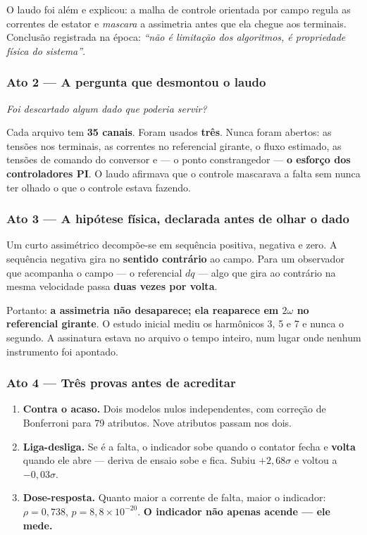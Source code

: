 \documentclass[12pt,a4paper]{article}
\begin{document}
O laudo foi além e explicou: a malha de controle orientada por campo regula as correntes de estator e \emph{mascara} a assimetria antes que ela chegue aos terminais. Conclusão registrada na época: \emph{``não é limitação dos algoritmos, é propriedade física do sistema''}.

\subsubsection*{Ato 2 --- A pergunta que desmontou o laudo}

\emph{Foi descartado algum dado que poderia servir?}

Cada arquivo tem \textbf{35 canais}. Foram usados \textbf{três}. Nunca foram abertos: as tensões nos terminais, as correntes no referencial girante, o fluxo estimado, as tensões de comando do conversor e --- o ponto constrangedor --- \textbf{o esforço dos controladores PI}. O laudo afirmava que o controle mascarava a falta sem nunca ter olhado o que o controle estava fazendo.

\subsubsection*{Ato 3 --- A hipótese física, declarada antes de olhar o dado}

Um curto assimétrico decompõe-se em sequência positiva, negativa e zero. A sequência negativa gira no \textbf{sentido contrário} ao campo. Para um observador que acompanha o campo --- o referencial $dq$ --- algo que gira ao contrário na mesma velocidade passa \textbf{duas vezes por volta}.

Portanto: \textbf{a assimetria não desaparece; ela reaparece em $2\omega$ no referencial girante}. O estudo inicial mediu os harmônicos 3, 5 e 7 e nunca o segundo. A assinatura estava no arquivo o tempo inteiro, num lugar onde nenhum instrumento foi apontado.

\subsubsection*{Ato 4 --- Três provas antes de acreditar}

\begin{enumerate}[nosep]
    \item \textbf{Contra o acaso.} Dois modelos nulos independentes, com correção de Bonferroni para 79 atributos. Nove atributos passam nos dois.
    \item \textbf{Liga-desliga.} Se é a falta, o indicador sobe quando o contator fecha e \textbf{volta} quando ele abre --- deriva de ensaio sobe e fica. Subiu $+2{,}68\sigma$ e voltou a $-0{,}03\sigma$.
    \item \textbf{Dose-resposta.} Quanto maior a corrente de falta, maior o indicador: $\rho = 0{,}738$, $p = 8{,}8\times10^{-20}$. \textbf{O indicador não apenas acende --- ele mede.}
\end{enumerate}
\end{document}
